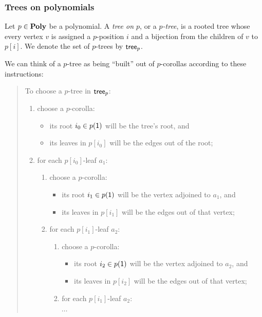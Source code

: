 \documentclass[Book-Poly]{subfiles}
\begin{document}
\subsubsection{Trees on polynomials}

\begin{definition} \label{def.poly_tree}
Let $p\in\mathbf{Poly}$ be a polynomial.
A \emph{tree on $p$}, or a \emph{$p$-tree}, is a rooted tree whose every vertex $v$ is assigned a $p$-position $i$ and a bijection from the children of $v$ to $p[i]$.
We denote the set of $p$-trees by $\mathsf{tree}_p$.
\end{definition}
We can think of a $p$-tree as being ``built'' out of $p$-corollas according to these instructions:
\begin{quote}
To choose a $p$-tree in $\mathsf{tree}_p$: 
\begin{enumerate}
    \item choose a $p$-corolla:
    \begin{itemize}
        \item its root $i_0\in p(\textsf{1})$ will be the tree's root, and
        \item its leaves in $p[i_0]$ will be the edges out of the root;
    \end{itemize}
    \item for each $p[i_0]$-leaf $a_1$:
    \begin{enumerate}[label*=\arabic*.]
        \item choose a $p$-corolla:
        \begin{itemize}
            \item its root $i_1\in p(\textsf{1})$ will be the vertex adjoined to $a_1$, and
            \item its leaves in $p[i_1]$ will be the edges out of that vertex;
        \end{itemize}
        \item for each $p[i_1]$-leaf $a_2$:
        \begin{enumerate}[label*=\arabic*.]
            \item choose a $p$-corolla:
            \begin{itemize}
                \item its root $i_2\in p(\textsf{1})$ will be the vertex adjoined to $a_2$, and
                \item its leaves in $p[i_2]$ will be the edges out of that vertex;
            \end{itemize}
            \item for each $p[i_1]$-leaf $a_2$:
            
            $\cdots$
        \end{enumerate}
    \end{enumerate}
\end{enumerate}
\end{quote}
\end{document}
